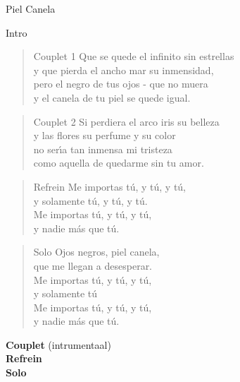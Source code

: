 \begin{song}[son]{Piel Canela}

\begin{instrumental}{Intro}
      
\end{instrumental}

\begin{verse}{Couplet 1}
  Que se quede el infinito sin estrellas\hspace{3em}
  \\
  y que pierda el ancho mar su inmensidad,
  \\
  pero el negro de tus ojos - que no muera
  \\
  y el canela de tu piel se quede igual.
\end{verse}

\begin{verse}{Couplet 2}
  Si perdiera el arco iris su belleza\hspace{3em}
  \\
  y las flores su perfume y su color
  \\
  no ser\'{\i}a tan inmensa mi tristeza
  \\
  como aquella de quedarme sin tu amor.
\end{verse}

\begin{verse}{Refrein}
  Me importas t\'{u}, y t\'{u}, y t\'{u},  \\
  y solamente t\'{u}, y t\'{u}, y t\'{u}.  \\
  Me importas t\'{u}, y t\'{u}, y t\'{u},  \\
  y nadie m\'{a}s que t\'{u}.
\end{verse}

\begin{verse}{Solo}
  Ojos negros, piel canela,  \\
  que me llegan a desesperar.  \\
  Me importas t\'{u}, y t\'{u}, y t\'{u},  \\
  y solamente t\'{u}\hspace{2em}\hspace{2em}\\
  Me importas t\'{u}, y t\'{u}, y t\'{u},\\
  y nadie m\'{a}s que t\'{u}.
\end{verse}

\textbf{Couplet} (intrumentaal)\\
\textbf{Refrein}\\
\textbf{Solo}
\end{song}
